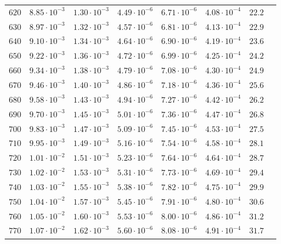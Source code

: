 \begin{table}
\begin{tabular}{lccccccc}
$620 $&$ 8.85\cdot 10^{-3} $&$ 1.30\cdot 10^{-3} $&$ 4.49\cdot 10^{-6} $&$ 6.71\cdot 10^{-6} $&$ 4.08\cdot 10^{-4} $&$ 22.2$\\
$630 $&$ 8.97\cdot 10^{-3} $&$ 1.32\cdot 10^{-3} $&$ 4.57\cdot 10^{-6} $&$ 6.81\cdot 10^{-6} $&$ 4.13\cdot 10^{-4} $&$ 22.9$\\
$640 $&$ 9.10\cdot 10^{-3} $&$ 1.34\cdot 10^{-3} $&$ 4.64\cdot 10^{-6} $&$ 6.90\cdot 10^{-6} $&$ 4.19\cdot 10^{-4} $&$ 23.6$\\
$650 $&$ 9.22\cdot 10^{-3} $&$ 1.36\cdot 10^{-3} $&$ 4.72\cdot 10^{-6} $&$ 6.99\cdot 10^{-6} $&$ 4.25\cdot 10^{-4} $&$ 24.2$\\
$660 $&$ 9.34\cdot 10^{-3} $&$ 1.38\cdot 10^{-3} $&$ 4.79\cdot 10^{-6} $&$ 7.08\cdot 10^{-6} $&$ 4.30\cdot 10^{-4} $&$ 24.9$\\
$670 $&$ 9.46\cdot 10^{-3} $&$ 1.40\cdot 10^{-3} $&$ 4.86\cdot 10^{-6} $&$ 7.18\cdot 10^{-6} $&$ 4.36\cdot 10^{-4} $&$ 25.6$\\
$680 $&$ 9.58\cdot 10^{-3} $&$ 1.43\cdot 10^{-3} $&$ 4.94\cdot 10^{-6} $&$ 7.27\cdot 10^{-6} $&$ 4.42\cdot 10^{-4} $&$ 26.2$\\
$690 $&$ 9.70\cdot 10^{-3} $&$ 1.45\cdot 10^{-3} $&$ 5.01\cdot 10^{-6} $&$ 7.36\cdot 10^{-6} $&$ 4.47\cdot 10^{-4} $&$ 26.8$\\
$700 $&$ 9.83\cdot 10^{-3} $&$ 1.47\cdot 10^{-3} $&$ 5.09\cdot 10^{-6} $&$ 7.45\cdot 10^{-6} $&$ 4.53\cdot 10^{-4} $&$ 27.5$\\
$710 $&$ 9.95\cdot 10^{-3} $&$ 1.49\cdot 10^{-3} $&$ 5.16\cdot 10^{-6} $&$ 7.54\cdot 10^{-6} $&$ 4.58\cdot 10^{-4} $&$ 28.1$\\
$720 $&$ 1.01\cdot 10^{-2} $&$ 1.51\cdot 10^{-3} $&$ 5.23\cdot 10^{-6} $&$ 7.64\cdot 10^{-6} $&$ 4.64\cdot 10^{-4} $&$ 28.7$\\
$730 $&$ 1.02\cdot 10^{-2} $&$ 1.53\cdot 10^{-3} $&$ 5.31\cdot 10^{-6} $&$ 7.73\cdot 10^{-6} $&$ 4.69\cdot 10^{-4} $&$ 29.4$\\
$740 $&$ 1.03\cdot 10^{-2} $&$ 1.55\cdot 10^{-3} $&$ 5.38\cdot 10^{-6} $&$ 7.82\cdot 10^{-6} $&$ 4.75\cdot 10^{-4} $&$ 29.9$\\
$750 $&$ 1.04\cdot 10^{-2} $&$ 1.57\cdot 10^{-3} $&$ 5.45\cdot 10^{-6} $&$ 7.91\cdot 10^{-6} $&$ 4.80\cdot 10^{-4} $&$ 30.6$\\
$760 $&$ 1.05\cdot 10^{-2} $&$ 1.60\cdot 10^{-3} $&$ 5.53\cdot 10^{-6} $&$ 8.00\cdot 10^{-6} $&$ 4.86\cdot 10^{-4} $&$ 31.2$\\
$770 $&$ 1.07\cdot 10^{-2} $&$ 1.62\cdot 10^{-3} $&$ 5.60\cdot 10^{-6} $&$ 8.08\cdot 10^{-6} $&$ 4.91\cdot 10^{-4} $&$ 31.7$\\

\end{tabular}
\end{table}
